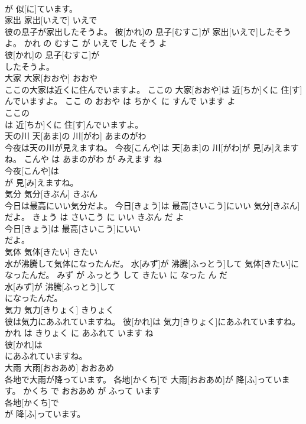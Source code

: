 \documentclass[8pt]{extreport}
\begin{document}
\begin{CJK}{UTF8}{min}
\\	が 似[に]ています。			
\\	家出	家出[いえで]	いえで	
\\	彼の息子が家出したそうよ。	彼[かれ]の 息子[むすこ]が 家出[いえで]したそうよ。	かれ の むすこ が いえで した そう よ	
\\	彼[かれ]の 息子[むすこ]が
\\	したそうよ。			
\\	大家	大家[おおや]	おおや	
\\	ここの大家は近くに住んでいますよ。	ここの 大家[おおや]は 近[ちか]くに 住[す]んでいますよ。	ここ の おおや は ちかく に すんで います よ	
\\	ここの
\\	は 近[ちか]くに 住[す]んでいますよ。			
\\	天の川	天[あま]の 川[がわ]	あまのがわ	
\\	今夜は天の川が見えますね。	今夜[こんや]は 天[あま]の 川[がわ]が 見[み]えますね。	こんや は あまのがわ が みえます ね	
\\	今夜[こんや]は
\\	が 見[み]えますね。			
\\	気分	気分[きぶん]	きぶん	
\\	今日は最高にいい気分だよ。	今日[きょう]は 最高[さいこう]にいい 気分[きぶん]だよ。	きょう は さいこう に いい きぶん だ よ	
\\	今日[きょう]は 最高[さいこう]にいい
\\	だよ。			
\\	気体	気体[きたい]	きたい	
\\	水が沸騰して気体になったんだ。	水[みず]が 沸騰[ふっとう]して 気体[きたい]になったんだ。	みず が ふっとう して きたい に なった ん だ	
\\	水[みず]が 沸騰[ふっとう]して
\\	になったんだ。			
\\	気力	気力[きりょく]	きりょく	
\\	彼は気力にあふれていますね。	彼[かれ]は 気力[きりょく]にあふれていますね。	かれ は きりょく に あふれて います ね	
\\	彼[かれ]は
\\	にあふれていますね。			
\\	大雨	大雨[おおあめ]	おおあめ	
\\	各地で大雨が降っています。	各地[かくち]で 大雨[おおあめ]が 降[ふ]っています。	かくち で おおあめ が ふって います	
\\	各地[かくち]で
\\	が 降[ふ]っています。			

\end{CJK}
\end{document}
